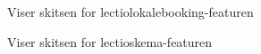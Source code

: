 \documentclass[12pt, a4paper]{article}
\begin{document}
\begin{appendices}
        \begin{figure}[H]
            \centering
            \caption{Viser skitsen for lectiolokalebooking-featuren}
        \end{figure}\newpage

        \begin{figure}[H]
            \centering
            \caption{Viser skitsen for lectioskema-featuren}
        \end{figure}\newpage
        \renewcommand*{\thepage}{\arabic{page}}


\end{appendices}
\end{document}
